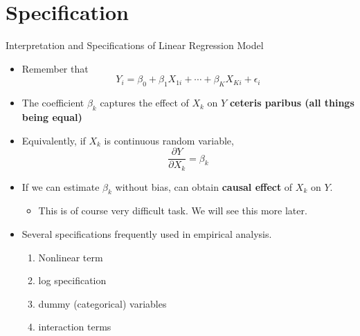\documentclass[
  ignorenonframetext,
]{beamer}
\providecommand{\tightlist}{%
  \setlength{\itemsep}{0pt}\setlength{\parskip}{0pt}}
\begin{document}
\hypertarget{specification}{%
\section{Specification}\label{specification}}

\begin{frame}{Interpretation and Specifications of Linear Regression
Model}
\protect\hypertarget{interpretation-and-specifications-of-linear-regression-model}{}

\begin{itemize}
\tightlist
\item
  Remember that \[ 
    Y_{i}=\beta_{0}+\beta_{1}X_{1i}+\cdots+\beta_{K}X_{Ki}+\epsilon_{i} 
    \]
\item
  The coefficient \(\beta_k\) captures the effect of \(X_k\) on \(Y\)
  \textbf{ceteris paribus (all things being equal)}
\item
  Equivalently, if \(X_k\) is continuous random variable, \[
    \frac{\partial Y}{\partial X_k} = \beta_k 
        \]
\item
  If we can estimate \(\beta_k\) without bias, can obtain \textbf{causal
  effect} of \(X_k\) on \(Y\).

  \begin{itemize}
  \tightlist
  \item
    This is of course very difficult task. We will see this more later.
  \end{itemize}
\item
  Several specifications frequently used in empirical analysis.

  \begin{enumerate}
  \tightlist
  \item
    Nonlinear term
  \item
    log specification
  \item
    dummy (categorical) variables
  \item
    interaction terms
  \end{enumerate}
\end{itemize}

\end{frame}
\end{document}
